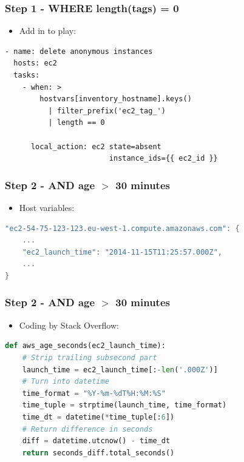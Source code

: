 \documentclass{beamer}
\begin{document}
\begin{frame}[fragile]\frametitle{Step 1 - WHERE length(tags) = 0}

    \begin{itemize}
        \item Add in to play:
    \end{itemize}

    \begin{lstlisting}
- name: delete anonymous instances
  hosts: ec2
  tasks:
    - when: >
        hostvars[inventory_hostname].keys()
          | filter_prefix('ec2_tag_')
          | length == 0

      local_action: ec2 state=absent
                        instance_ids={{ ec2_id }}
    \end{lstlisting}

\end{frame}


\begin{frame}[fragile]\frametitle{Step 2 - AND age $>$ 30 minutes}

    \begin{itemize}
        \item Host variables:
    \end{itemize}

    \begin{lstlisting}[language=C]
"ec2-54-75-123-123.eu-west-1.compute.amazonaws.com": {
    ...
    "ec2_launch_time": "2014-11-15T11:25:57.000Z",
    ...
}
    \end{lstlisting}

\end{frame}


\begin{frame}[fragile]\frametitle{Step 2 - AND age $>$ 30 minutes}

    \begin{itemize}
        \item Coding by Stack Overflow:
    \end{itemize}

    \begin{lstlisting}[language=Python]
def aws_age_seconds(ec2_launch_time):
    # Strip trailing subsecond part
    launch_time = ec2_launch_time[:-len('.000Z')]
    # Turn into datetime
    time_format = "%Y-%m-%dT%H:%M:%S"
    time_tuple = strptime(launch_time, time_format)
    time_dt = datetime(*time_tuple[:6])
    # Return difference in seconds
    diff = datetime.utcnow() - time_dt
    return seconds_diff.total_seconds()
    \end{lstlisting}

\end{frame}
\end{document}
